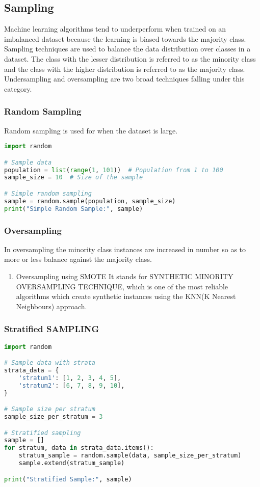 \documentclass[11pt]{article}
\begin{document}
\subsection{Sampling}
\label{sec:org2f49b1f}
Machine learning algorithms tend to underperform when trained on an imbalanced dataset because the learning is biased towards the majority class.
Sampling techniques are used to balance the data distribution over classes in a dataset. The class with the lesser distribution is referred to as the minority class and the class with the higher distribution is referred to as the majority class. Undersampling and oversampling are two broad techniques falling under this category.
\subsubsection{Random Sampling}
\label{sec:org42bfb79}
Random sampling is used for when the dataset is large.
\begin{lstlisting}[language=Python,numbers=none]
import random

# Sample data
population = list(range(1, 101))  # Population from 1 to 100
sample_size = 10  # Size of the sample

# Simple random sampling
sample = random.sample(population, sample_size)
print("Simple Random Sample:", sample)
\end{lstlisting}
\subsubsection{Oversampling}
\label{sec:orgf1c4acc}
In oversampling the minority class instances are increased in number so as to more or less balance against the majority class.
\begin{enumerate}
\item Oversampling using SMOTE
\label{sec:org79676fe}
It stands for SYNTHETIC MINORITY OVERSAMPLING TECHNIQUE, which is one of the most reliable algorithms which create synthetic instances using the KNN(K Nearest Neighbours) approach.
\end{enumerate}
\subsubsection{Stratified SAMPLING}
\label{sec:org86ffac4}
\begin{lstlisting}[language=Python,numbers=none]
import random

# Sample data with strata
strata_data = {
    'stratum1': [1, 2, 3, 4, 5],
    'stratum2': [6, 7, 8, 9, 10],
}

# Sample size per stratum
sample_size_per_stratum = 3

# Stratified sampling
sample = []
for stratum, data in strata_data.items():
    stratum_sample = random.sample(data, sample_size_per_stratum)
    sample.extend(stratum_sample)

print("Stratified Sample:", sample)
\end{lstlisting}
\end{document}
